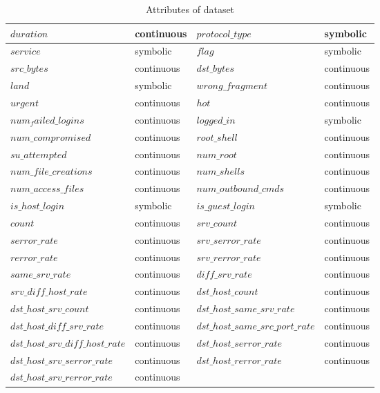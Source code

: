 \documentclass[runningheads]{llncs}
\begin{document}
	\begin{table}
		\centering
		\caption{Attributes of dataset}\label{table:dataset}
		\begin{tabular}{|m{14em}|m{6em}|m{14em}|m{6em}|}
			\hline
			$duration$ & continuous & $protocol\_type$ & symbolic \\ 
			\hline
			$service$ & symbolic & $flag$ & symbolic \\ 
			\hline
			$src\_bytes$ & continuous & $dst\_bytes$ & continuous \\ 
			\hline
			$land$ & symbolic & $wrong\_fragment$ & continuous \\ 
			\hline
			$urgent$ & continuous & $hot$ & continuous \\ 
			\hline
			$num_failed\_logins$ & continuous & $logged\_in$ & symbolic \\ 
			\hline
			$num\_compromised$ & continuous & $root\_shell$ & continuous \\ 
			\hline
			$su\_attempted$ & continuous & $num\_root$ & continuous \\ 
			\hline
			$num\_file\_creations$ & continuous & $num\_shells$ & continuous \\ 
			\hline
			$num\_access\_files$ & continuous & $num\_outbound\_cmds$ & continuous \\ 
			\hline
			$is\_host\_login$ & symbolic & $is\_guest\_login$ & symbolic \\ 
			\hline
			$count$ & continuous & $srv\_count$ & continuous \\ 
			\hline
			$serror\_rate$ & continuous & $srv\_serror\_rate$ & continuous \\ 
			\hline
			$rerror\_rate$ & continuous & $srv\_rerror\_rate$ & continuous \\ 
			\hline
			$same\_srv\_rate$ & continuous & $diff\_srv\_rate$ & continuous \\ 
			\hline
			$srv\_diff\_host\_rate$ & continuous & $dst\_host\_count$ & continuous \\ 
			\hline
			$dst\_host\_srv\_count$ & continuous & $dst\_host\_same\_srv\_rate$ & continuous \\ 
			\hline
			$dst\_host\_diff\_srv\_rate$ & continuous & $dst\_host\_same\_src\_port\_rate$ & continuous \\ 
			\hline
			$dst\_host\_srv\_diff\_host\_rate$ & continuous & $dst\_host\_serror\_rate$ & continuous \\ 
			\hline
			$dst\_host\_srv\_serror\_rate$ & continuous & $dst\_host\_rerror\_rate$ & continuous \\ 
			\hline
			$dst\_host\_srv\_rerror\_rate$ & continuous & &  \\ 
			\hline
		\end{tabular}
	\end{table}
	
\end{document}
